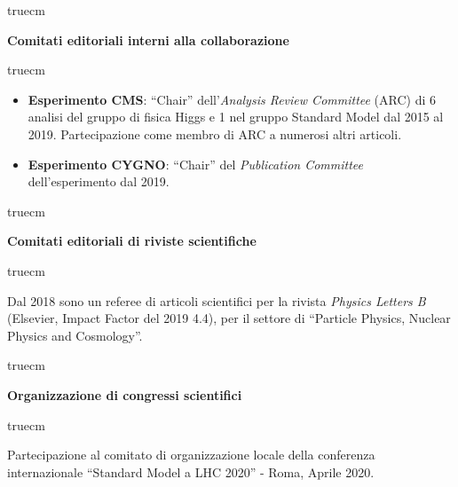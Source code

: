 \documentclass[11pt,twoside,a4paper]{article}
\begin{document}
\clearpage

 truecm
\begin{center}
\textbf{Comitati editoriali interni alla collaborazione}
\end{center}
 truecm

\begin{itemize}
\item \textbf{Esperimento CMS}: ``Chair'' dell'\textit{Analysis Review
  Committee} (ARC) di 6 analisi del gruppo di fisica Higgs e 1 nel
  gruppo Standard Model dal 2015 al 2019. Partecipazione come membro
  di ARC a numerosi altri articoli.
\item \textbf{Esperimento CYGNO}: ``Chair'' del \textit{Publication
  Committee} dell'esperimento dal 2019.
\end{itemize}


 truecm
\begin{center}
\textbf{Comitati editoriali di riviste scientifiche}
\end{center}
 truecm

Dal 2018 sono un referee di articoli scientifici per la rivista
\textit{Physics Letters B} (Elsevier, Impact Factor del 2019 4.4), per
il settore di ``Particle Physics, Nuclear Physics and Cosmology''.


 truecm
\begin{center}
\textbf{Organizzazione di congressi scientifici}
\end{center}
 truecm

Partecipazione al comitato di organizzazione locale della conferenza
internazionale ``Standard Model a LHC 2020'' - Roma, Aprile 2020. 
\end{document}
